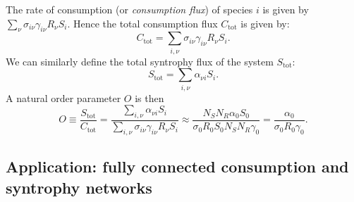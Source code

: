 \documentclass[12pt, titlepage]{report}
\begin{document}
The rate of consumption (or \textit{consumption flux}) of species $i$ is given by $\sum_\nu \sigma_{i\nu}\gamma_{i\nu}R_\nu S_i$. Hence the total consumption flux $C_{\text{tot}}$ is given by:
\begin{equation}
C_{\text{tot}} = \sum_{i, \nu} \sigma_{i\nu} \gamma_{i\nu}R_\nu S_i.
\end{equation}
We can similarly define the total syntrophy flux of the system $S_{\text{tot}}$:
\begin{equation}
S_{\text{tot}} = \sum_{i, \nu} \alpha_{\nu i} S_i.
\end{equation}
A natural order parameter $O$ is then
\begin{equation}
O \equiv \frac{S_{\text{tot}}}{C_{\text{tot}}} = \frac{\sum_{i, \nu} \alpha_{\nu i} S_i}{\sum_{i,\nu}\sigma_{i\nu} \gamma_{i\nu}R_\nu S_i} \approx \frac{N_S N_R \alpha_0 S_0}{\sigma_0 R_0 S_0 N_S N_R \gamma_0} = \frac{\alpha_0}{\sigma_0 R_0 \gamma_0}.
\end{equation}

\subsection{Application: fully connected consumption and syntrophy networks}

\end{document}
